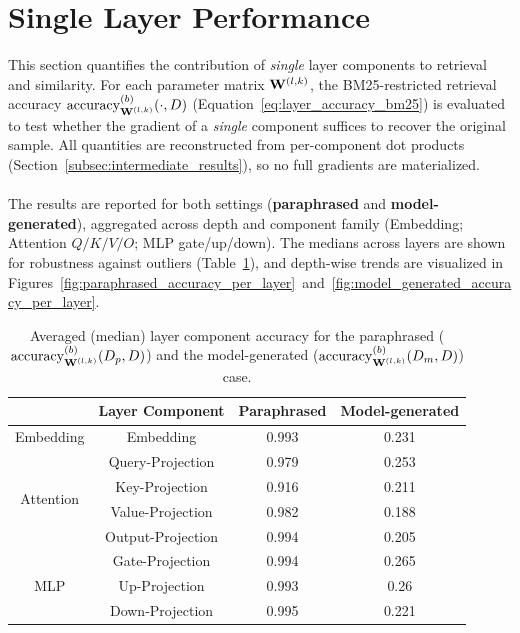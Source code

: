 \section{Single Layer Performance}\label{sec:single_layer_perf}
This section quantifies the contribution of \emph{single} layer components to retrieval and similarity. For each parameter matrix $\mathbf{W}^{(l,k)}$, the BM25-restricted retrieval accuracy $\operatorname{accuracy}^{(b)}_{\mathbf{W}^{(l,k)}}(\cdot,D)$ (Equation~\ref{eq:layer_accuracy_bm25}) is evaluated to test whether the gradient of a \emph{single} component suffices to recover the original sample. All quantities are reconstructed from per-component dot products (Section~\ref{subsec:intermediate_results}), so no full gradients are materialized.
\\\\
The results are reported for both settings (\textbf{paraphrased} and \textbf{model-generated}), aggregated across depth and component family (Embedding; Attention $Q/K/V/O$; MLP gate/up/down). The medians across layers are shown for robustness against outliers (Table~\ref{tab:average_accuracy_layer_component}), and depth-wise trends are visualized in Figures~\ref{fig:paraphrased_accuracy_per_layer}~and~\ref{fig:model_generated_accuracy_per_layer}.
\begin{table}[h]
    \centering
    \begin{tabular}{|c|c|c|c|}
        \hline
        & \textbf{Layer Component} & \textbf{Paraphrased} & \textbf{Model-generated} \\
        \hline
        \multirow{1}{5em}{Embedding}
        & Embedding & 0.993 & 0.231 \\
        \hline
        \multirow{4}{5em}{Attention}
        & Query-Projection & 0.979 & 0.253 \\
        & Key-Projection & 0.916 & 0.211 \\
        & Value-Projection & 0.982 & 0.188 \\
        & Output-Projection & 0.994 & 0.205 \\
        \hline
        \multirow{3}{5em}{MLP}
        & Gate-Projection & 0.994 & 0.265 \\
        & Up-Projection & 0.993 & 0.26 \\
        & Down-Projection & 0.995 & 0.221 \\
        \hline
    \end{tabular}
    \caption{Averaged (median) layer component accuracy for the paraphrased ($\operatorname{accuracy}^{(b)}_{\mathbf{W}^{(l,k)}}(D_p,D)$) and the model-generated ($\operatorname{accuracy}^{(b)}_{\mathbf{W}^{(l,k)}}(D_m,D)$) case. }
    \label{tab:average_accuracy_layer_component}
\end{table}
